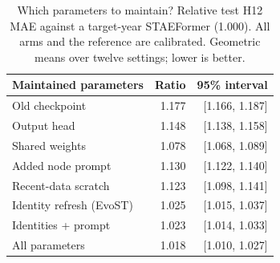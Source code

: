 \begin{table}[t]
\centering
\caption{Which parameters to maintain? Relative test H12 MAE against a target-year STAEFormer (1.000). All arms and the reference are calibrated. Geometric means over twelve settings; lower is better.}
\label{tab:maintenance}
\begin{tabular}{lrr}
\toprule
Maintained parameters & Ratio & 95\% interval \\
\midrule
Old checkpoint & 1.177 & [1.166, 1.187] \\
Output head & 1.148 & [1.138, 1.158] \\
Shared weights & 1.078 & [1.068, 1.089] \\
Added node prompt & 1.130 & [1.122, 1.140] \\
Recent-data scratch & 1.123 & [1.098, 1.141] \\
Identity refresh (EvoST) & 1.025 & [1.015, 1.037] \\
Identities + prompt & 1.023 & [1.014, 1.033] \\
All parameters & 1.018 & [1.010, 1.027] \\
\bottomrule
\end{tabular}
\end{table}
